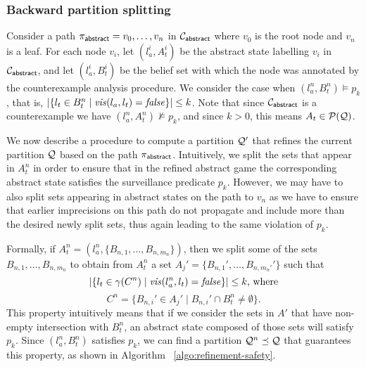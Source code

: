 \subsubsection{Backward partition splitting}
Consider a path $\pi_{\mathsf{abstract}} = v_0,\ldots, v_n$ in $\mathcal{C}_{\mathsf{abstract}}$ where $v_0$ is the root node and $v_n$ is a leaf. For each node $v_i$, let $(l_a^i,A_t^i) $ be the abstract state labelling $v_i$ in $\mathcal{C}_{\mathsf{abstract}}$, and let $(l_a^i,B_t^i)$ be the  belief set with which the node was annotated by the counterexample analysis procedure. We consider the case when $(l_a^n,B_t^n) \models p_k$, that is, $|\{l_t \in B_t^n \mid \mathit{vis}(l_a,l_t) = \mathit{false}\}| \leq k$.
Note that since $\mathcal{C}_{\mathsf{abstract}}$ is a counterexample we have $(l_a^n,A_t^n) \not \models p_k$, and since $k>0$, this means $A_t \in \mathcal{P}(\mathcal{Q})$.


We now describe a procedure to compute a partition $\mathcal{Q}'$ that refines the current partition $\mathcal{Q}$ based on the path $\pi_{\mathsf{abstract}}$. Intuitively, we split the sets that appear in $A_t^n$ in order to ensure that in the refined abstract game the corresponding abstract state satisfies the surveillance predicate $p_k$. However, we may have to also split sets appearing in abstract states on the path to $v_n$ as we have to ensure that earlier imprecisions on this path do not propagate and include more than the desired newly split sets, thus again leading to the same violation of $p_k$.

Formally, if $A_t^n = (l_a^n,\{B_{n,1},\ldots,B_{n,m_n}\})$, then we split some of the sets $B_{n,1},\ldots,B_{n,m_n}$ to obtain from $A_t^n$ a set $A_j' = \{B_{n,1}',\ldots,B_{n,m_n'}'\}$ such that
\[|\{l_t \in \gamma(C^n) \mid \mathit{vis}(l_a^n,l_t) = \mathit{false}\}| \leq k \text{, where}\] 
\[C^n = \{B_{n,i}' \in A_j' \mid B_{n,i}' \cap B_t^n \neq \emptyset\}.\]
This property intuitively means that if we consider the sets in $A'$ that have non-empty intersection with $B_t^n$, an abstract state composed of those sets will satisfy $p_k$. Since $(l_a^n,B_t^n)$ satisfies $p_k$, we can find a partition $\mathcal{Q}^n \preceq \mathcal{Q}$ that guarantees this property, as shown in Algorithm ~\ref{algo:refinement-safety}.
 
